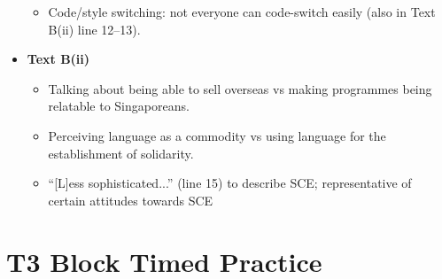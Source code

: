 \documentclass[../main.tex]{subfiles}
\begin{document}
\begin{itemize}
\begin{itemize}
                \item Code/style switching: not everyone can code-switch easily (also in Text B(ii) line 12--13).
            \end{itemize}
            \item \textbf{Text B(ii)} \begin{itemize}
                \item Talking about being able to sell overseas vs making programmes being relatable to Singaporeans.
                \item Perceiving language as a commodity vs using language for the establishment of solidarity.
                \item ``[L]ess sophisticated...'' (line 15) to describe SCE; representative of certain attitudes towards SCE
            \end{itemize}
        \end{itemize}
		
		\section*{T3 Block Timed Practice}
\end{document}
